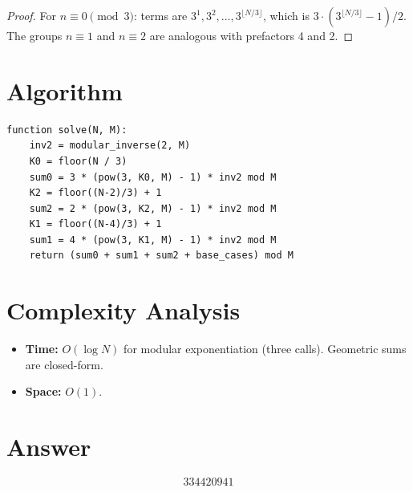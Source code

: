 \documentclass[12pt]{article}
\begin{document}
\begin{proof}
For $n \equiv 0\pmod{3}$: terms are $3^1, 3^2, \ldots, 3^{\lfloor N/3\rfloor}$, which is $3\cdot(3^{\lfloor N/3\rfloor}-1)/2$. The groups $n\equiv 1$ and $n\equiv 2$ are analogous with prefactors 4 and 2.
\end{proof}

\section{Algorithm}

\begin{verbatim}
function solve(N, M):
    inv2 = modular_inverse(2, M)
    K0 = floor(N / 3)
    sum0 = 3 * (pow(3, K0, M) - 1) * inv2 mod M
    K2 = floor((N-2)/3) + 1
    sum2 = 2 * (pow(3, K2, M) - 1) * inv2 mod M
    K1 = floor((N-4)/3) + 1
    sum1 = 4 * (pow(3, K1, M) - 1) * inv2 mod M
    return (sum0 + sum1 + sum2 + base_cases) mod M
\end{verbatim}

\section{Complexity Analysis}

\begin{itemize}
\item \textbf{Time:} $O(\log N)$ for modular exponentiation (three calls). Geometric sums are closed-form.
\item \textbf{Space:} $O(1)$.
\end{itemize}

\section{Answer}

\[
\boxed{334420941}
\]
\end{document}
